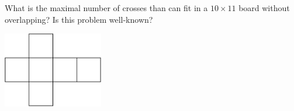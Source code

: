 What is the maximal number of crosses than can fit in a $10\times 11$ board without overlapping?
Is this problem well-known?
\begin{center}
\includegraphics[width = 43.6mm]{img/fig0.png}
\end{center}